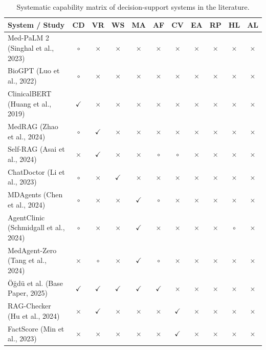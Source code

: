 \documentclass[12pt,a4paper]{report}
\begin{document}
\begin{table}[H]
\centering
\caption{Systematic capability matrix of decision-support systems in the literature.}
\label{tab:lit_comparison}
\scriptsize
\begin{tabularx}{\textwidth}{lcccccccccc}
\toprule
\textbf{System / Study} & \textbf{CD} & \textbf{VR} & \textbf{WS} & \textbf{MA} & \textbf{AF} & \textbf{CV} & \textbf{EA} & \textbf{RP} & \textbf{HL} & \textbf{AL} \\
\midrule
Med-PaLM 2 (Singhal et al., 2023) & $\circ$ & $\times$ & $\times$ & $\times$ & $\times$ & $\times$ & $\times$ & $\times$ & $\times$ & $\times$ \\
BioGPT (Luo et al., 2022) & $\circ$ & $\times$ & $\times$ & $\times$ & $\times$ & $\times$ & $\times$ & $\times$ & $\times$ & $\times$ \\
ClinicalBERT (Huang et al., 2019) & $\checkmark$ & $\times$ & $\times$ & $\times$ & $\times$ & $\times$ & $\times$ & $\times$ & $\times$ & $\times$ \\
MedRAG (Zhao et al., 2024) & $\circ$ & $\checkmark$ & $\times$ & $\times$ & $\times$ & $\times$ & $\times$ & $\times$ & $\times$ & $\times$ \\
Self-RAG (Asai et al., 2024) & $\times$ & $\checkmark$ & $\times$ & $\times$ & $\circ$ & $\circ$ & $\times$ & $\times$ & $\times$ & $\times$ \\
ChatDoctor (Li et al., 2023) & $\circ$ & $\times$ & $\checkmark$ & $\times$ & $\times$ & $\times$ & $\times$ & $\times$ & $\times$ & $\times$ \\
MDAgents (Chen et al., 2024) & $\circ$ & $\times$ & $\times$ & $\checkmark$ & $\circ$ & $\times$ & $\times$ & $\times$ & $\times$ & $\times$ \\
AgentClinic (Schmidgall et al., 2024) & $\circ$ & $\times$ & $\times$ & $\checkmark$ & $\times$ & $\times$ & $\times$ & $\times$ & $\circ$ & $\times$ \\
MedAgent-Zero (Tang et al., 2024) & $\times$ & $\circ$ & $\times$ & $\checkmark$ & $\circ$ & $\times$ & $\times$ & $\times$ & $\times$ & $\times$ \\
Öğdü et al. (Base Paper, 2025) & $\checkmark$ & $\checkmark$ & $\checkmark$ & $\checkmark$ & $\checkmark$ & $\times$ & $\times$ & $\times$ & $\times$ & $\times$ \\
RAG-Checker (Hu et al., 2024) & $\times$ & $\checkmark$ & $\times$ & $\times$ & $\times$ & $\checkmark$ & $\times$ & $\times$ & $\times$ & $\times$ \\
FactScore (Min et al., 2023) & $\times$ & $\times$ & $\times$ & $\times$ & $\times$ & $\checkmark$ & $\times$ & $\times$ & $\times$ & $\times$ \\

\end{tabularx}
\end{table}
\end{document}
